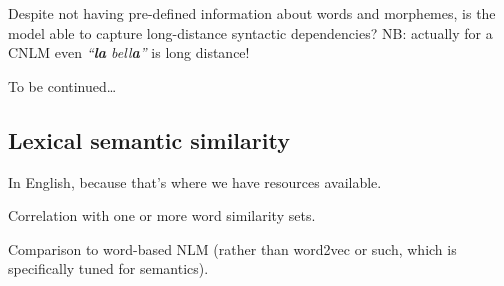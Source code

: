 Despite not having pre-defined information about words and morphemes,
is the model able to capture long-distance syntactic dependencies? NB:
actually for a CNLM even \emph{``\textbf{la} bell\textbf{a}''} is long
distance!

To be continued\ldots

\subsection{Lexical semantic similarity}
\label{sec:similarity}

In English, because that's where we have resources available.

Correlation with one or more word similarity sets.

Comparison to word-based NLM (rather than word2vec or such, which is
specifically tuned for semantics).

